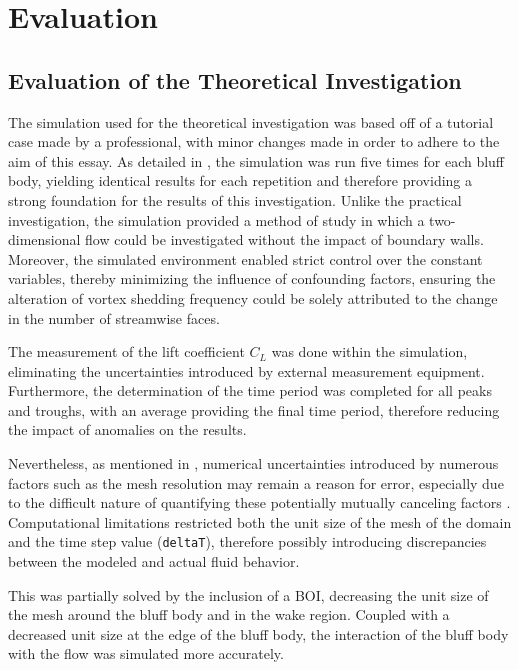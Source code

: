 \section{Evaluation}

\subsection{Evaluation of the Theoretical Investigation}
The simulation used for the theoretical investigation was based off of a tutorial case made by a professional, with minor changes made in order to adhere to the aim of this essay. As detailed in , the simulation was run five times for each bluff body, yielding identical results for each repetition and therefore providing a strong foundation for the results of this investigation. Unlike the practical investigation, the simulation provided a method of study in which a two-dimensional flow could be investigated without the impact of boundary walls. Moreover, the simulated environment enabled strict control over the constant variables, thereby minimizing the influence of confounding factors, ensuring the alteration of vortex shedding frequency could be solely attributed to the change in the number of streamwise faces. 

The measurement of the lift coefficient $C_L$ was done within the simulation, eliminating the uncertainties introduced by external measurement equipment. Furthermore, the determination of the time period was completed for all peaks and troughs, with an average providing the final time period, therefore reducing the impact of anomalies on the results.

Nevertheless, as mentioned in , numerical uncertainties introduced by numerous factors such as the mesh resolution may remain a reason for error, especially due to the difficult nature of quantifying these potentially mutually canceling factors \parencite{city7565}. Computational limitations restricted both the unit size of the mesh of the domain and the time step value (\verb*|deltaT|), therefore possibly introducing discrepancies between the modeled and actual fluid behavior.

This was partially solved by the inclusion of a BOI, decreasing the unit size of the mesh around the bluff body and in the wake region. Coupled with a decreased unit size at the edge of the bluff body, the interaction of the bluff body with the flow was simulated more accurately. 

